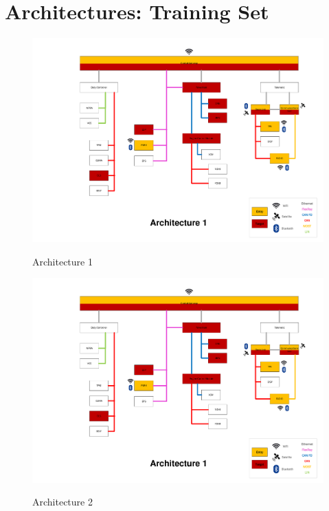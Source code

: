 \chapter{Architectures: Training Set}
\label{apx:surveyarch}

\begin{figure}[h]
    \centering
    \caption{Architecture 1}
    \includegraphics[width=\textwidth, page=1]{../Architectures-survey.pdf}
    \label{fig:architecture1}
\end{figure}

\begin{figure}[h]
    \centering
    \caption{Architecture 2}
    \includegraphics[width=\textwidth, page=2]{../Architectures-survey.pdf}
    \label{fig:architecture2}
\end{figure}

